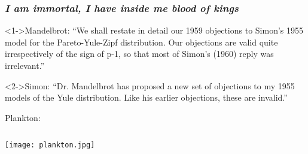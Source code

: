 \begin{frame}
  \frametitle{\small\textit{I am immortal, I have inside me blood of kings}}

  \begin{block}<1->{Mandelbrot:}
    ``We shall restate in detail our 1959 objections to Simon's 1955
    model for the Pareto-Yule-Zipf distribution.  
    Our objections are
    valid quite irrespectively of the sign of p-1, so that 
    most of
    Simon's (1960) reply was irrelevant.''\cite{mandelbrot1961a}
  \end{block}

  \begin{block}<2->{Simon:}
    ``Dr. Mandelbrot has proposed a new set of objections to my 1955
    models of the Yule distribution.  Like his earlier objections,
    these are invalid.''\cite{simon1961a}
  \end{block}

  \begin{overprint}
    \begin{block}{Plankton:}
      \smallskip
      \begin{columns}
        \texttt{[image: plankton.jpg]}
      \end{columns}
    \end{block}
  \end{overprint}


\end{frame}


